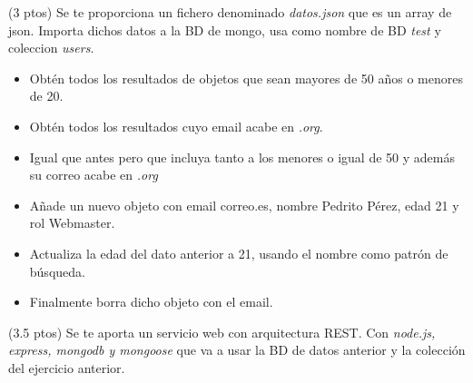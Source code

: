 \documentclass[addpoints,12pt]{exam}
\begin{document}
\begin{questions}
\newpage

\question(3 ptos) Se te proporciona un fichero denominado \emph{datos.json} que es un array de json. Importa dichos datos a la BD de mongo, usa como nombre de BD \emph{test} y coleccion \emph{users}.
\begin{itemize}
\item Obtén todos los resultados de objetos que sean mayores de 50 años o menores de 20.
\item Obtén todos los resultados cuyo email acabe en \emph{.org}.
\item Igual que antes pero que incluya tanto a los menores o igual de 50 y además su correo acabe en \emph{.org}
\item Añade un nuevo objeto con email correo\@email.es, nombre Pedrito Pérez, edad 21 y rol Webmaster.
\item Actualiza la edad del dato anterior a 21, usando el nombre como patrón de búsqueda.
\item Finalmente borra dicho objeto con el email.
\end{itemize}

\question(3.5 ptos) Se te aporta un servicio web con arquitectura REST. Con \emph{node.js, express, mongodb y mongoose} que va a usar la BD de datos anterior y la colección del ejercicio anterior.
\end{questions}
\end{document}
